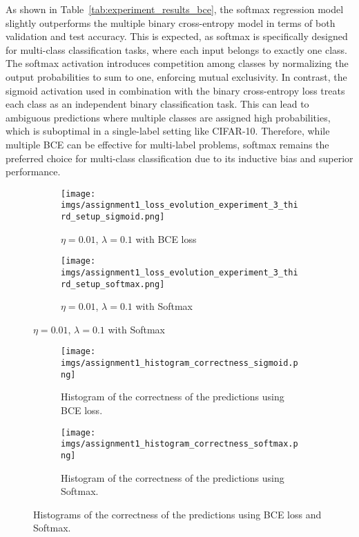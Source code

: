 \documentclass{article}
\begin{document}
As shown in Table~\ref{tab:experiment_results_bce}, the softmax regression model slightly outperforms the multiple binary cross-entropy model in terms of both validation and test accuracy. This is expected, as softmax is specifically designed for multi-class classification tasks, where each input belongs to exactly one class. The softmax activation introduces competition among classes by normalizing the output probabilities to sum to one, enforcing mutual exclusivity. In contrast, the sigmoid activation used in combination with the binary cross-entropy loss treats each class as an independent binary classification task. This can lead to ambiguous predictions where multiple classes are assigned high probabilities, which is suboptimal in a single-label setting like CIFAR-10. Therefore, while multiple BCE can be effective for multi-label problems, softmax remains the preferred choice for multi-class classification due to its inductive bias and superior performance.

\begin{figure}[h!]
    \centering
    \begin{subfigure}{0.45\textwidth}
        \texttt{[image: imgs/assignment1\_loss\_evolution\_experiment\_3\_third\_setup\_sigmoid.png]}
        \caption{$\eta=0.01$, $\lambda=0.1$ with BCE loss}
        \label{fig:exp_bce}
    \end{subfigure}
    \begin{subfigure}{0.45\textwidth}
        \texttt{[image: imgs/assignment1\_loss\_evolution\_experiment\_3\_third\_setup\_softmax.png]}
        \caption{$\eta=0.01$, $\lambda=0.1$ with Softmax}
        \label{fig:exp_softmax}
    \end{subfigure}
\end{figure}


\begin{figure}[h!]
    \centering
    \begin{subfigure}{0.45\textwidth}
        \texttt{[image: imgs/assignment1\_histogram\_correctness\_sigmoid.png]}
        \caption{Histogram of the correctness of the predictions using BCE loss.}
        \label{fig:exp_bce_hist}
    \end{subfigure}
    \begin{subfigure}{0.45\textwidth}
        \texttt{[image: imgs/assignment1\_histogram\_correctness\_softmax.png]}
        \caption{Histogram of the correctness of the predictions using Softmax.}
        \label{fig:exp_softmax_hist}
    \end{subfigure}
    \caption{Histograms of the correctness of the predictions using BCE loss and Softmax.}
    \label{fig:exp_hist}
\end{figure}
\end{document}
